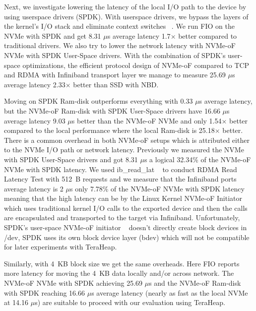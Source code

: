 Next, we investigate lowering the latency of the local I/O path to the device by using userspace drivers (SPDK). With userspace drivers, we bypass the layers of the kernel's I/O stack and eliminate context switches ~\cite{spdk}. We run FIO on the NVMe with SPDK and get 8.31 $\mu$s average latency 1.7$\times$ better compared to traditional drivers. We also try to lower
the network latency with NVMe-oF NVMe with SPDK User-Space drivers. With the combination of SPDK’s user-space optimizations, the efficient protocol design of NVMe-oF compared to TCP and RDMA with Infiniband transport layer we manage to measure 25.69 $\mu$s average latency 2.33$\times$ better than SSD with NBD. 

Moving on SPDK Ram-disk outperforms everything with 0.33 $\mu$s average latency,
but the NVMe-oF Ram-disk with SPDK User-Space drivers have 16.66 $\mu$s average
latency 9.03 $\mu$s better than the NVMe-oF NVMe and only 1.54$\times$ better
compared to the local performance where the local Ram-disk is 25.18$\times$
better. There is a common overhead in both NVMe-oF setups which is attributed
either to the NVMe I/O path or network latency. Previously we measured the NVMe
with SPDK User-Space drivers and got 8.31 $\mu$s a logical 32.34\% of the
NVMe-oF NVMe with SPDK latency. We used ib\_read\_lat ~\cite{perftest} to
conduct RDMA Read Latency Test with \SI{512}{B} requests and we measure that the
Infiniband ports average latency is 2 $\mu$s only 7.78\% of the NVMe-oF NVMe
with SPDK latency meaning that the high latency can be by the Linux Kernel
NVMe-oF Initiator which uses traditional kernel I/O calls to the exported device
and then the calls are encapsulated and transported to the target via
Infiniband. Unfortunately, SPDK's user-space NVMe-oF initiator ~\cite{spdk}
doesn't directly create block devices in /dev, SPDK uses its own block
device layer (bdev) which will not be compatible for later experiments with TeraHeap. 

Similarly, with \SI{4}{KB} block size we get the same overheads. Here FIO reports more latency for moving the \SI{4}{KB} data locally
and/or across network. The NVMe-oF NVMe with SPDK achieving 25.69 $\mu$s and the
NVMe-oF Ram-disk with SPDK reaching 16.66 $\mu$s average latency (nearly as fast
as the local NVMe at 14.16 $\mu$s) are suitable to proceed with our
evaluation using TeraHeap.

